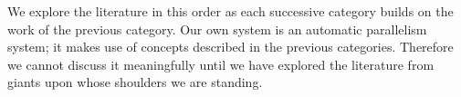 \noindent
We explore the literature in this order as each successive category builds
on the work of the previous category.
Our own system is an automatic parallelism system;
it makes use of concepts described in the previous categories.
Therefore
we cannot discuss it meaningfully until we have explored the literature
from giants upon whose shoulders we are standing.

% 



